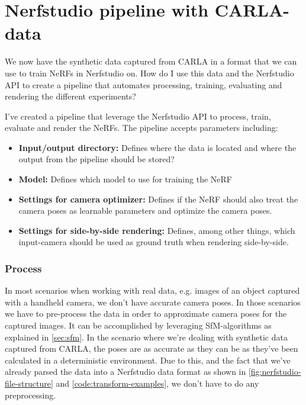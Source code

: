 \section{Nerfstudio pipeline with CARLA-data} \label{sec:nerfstudio-pipeline}
\begin{comment}
Premise: Have data in a Nerfstudio format, collected from CARLA.
Question: How can I train a NeRF that represent the same scene?

\begin{itemize}
    \item Explain the Nerfstudio API and the created pipeline. Train, eval, render
    \item Go into detail on e.g. the train/eval-split, training parameters, etc. Add additional info to the appendix.
\end{itemize}
\end{comment}

We now have the synthetic data captured from CARLA in a format that we can use to train NeRFs in Nerfstudio on. How do I use this data and the Nerfstudio API to create a pipeline that automates processing, training, evaluating and rendering the different experiments?

I've created a pipeline that leverage the Nerfstudio API to process, train, evaluate and render the NeRFs. The pipeline accepts parameters including:

\begin{itemize}
    \item \textbf{Input/output directory:} Defines where the data is located and where the output from the pipeline should be stored?
    \item \textbf{Model:} Defines which model to use for training the NeRF
    \item \textbf{Settings for camera optimizer:} Defines if the NeRF should also treat the camera poses as learnable parameters and optimize the camera poses.
    \item \textbf{Settings for side-by-side rendering:} Defines, among other things, which input-camera should be used as ground truth when rendering side-by-side.
\end{itemize}

\subsubsection{Process}

In most scenarios when working with real data, e.g. images of an object captured with a handheld camera, we don't have accurate camera poses. In those scenarios we have to pre-process the data in order to approximate camera poses for the captured images. It can be accomplished by leveraging SfM-algorithms as explained in \autoref{sec:sfm}. In the scenario where we're dealing with synthetic data captured from CARLA, the poses are as accurate as they can be as they've been calculated in a deterministic environment. Due to this, and the fact that we've already parsed the data into a Nerfstudio data format as shown in \autoref{fig:nerfstudio-file-structure} and \autoref{code:transform-examples}, we don't have to do any preprocessing.

